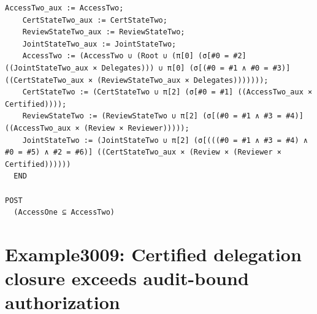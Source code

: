 \documentclass[10pt]{article}
\begin{document}
\begin{Verbatim}[fontsize=\tiny,breaklines=true,breakanywhere=true,frame=single,framesep=1.5mm]
    AccessTwo_aux := AccessTwo;
    CertStateTwo_aux := CertStateTwo;
    ReviewStateTwo_aux := ReviewStateTwo;
    JointStateTwo_aux := JointStateTwo;
    AccessTwo := (AccessTwo ∪ (Root ∪ (π[0] (σ[#0 = #2] ((JointStateTwo_aux × Delegates))) ∪ π[0] (σ[(#0 = #1 ∧ #0 = #3)] ((CertStateTwo_aux × (ReviewStateTwo_aux × Delegates)))))));
    CertStateTwo := (CertStateTwo ∪ π[2] (σ[#0 = #1] ((AccessTwo_aux × Certified))));
    ReviewStateTwo := (ReviewStateTwo ∪ π[2] (σ[(#0 = #1 ∧ #3 = #4)] ((AccessTwo_aux × (Review × Reviewer)))));
    JointStateTwo := (JointStateTwo ∪ π[2] (σ[(((#0 = #1 ∧ #3 = #4) ∧ #0 = #5) ∧ #2 = #6)] ((CertStateTwo_aux × (Review × (Reviewer × Certified))))))
  END

POST
  (AccessOne ⊆ AccessTwo)
\end{Verbatim}

\Needspace{0.45\textheight}

\section{Example3009: Certified delegation closure exceeds audit-bound authorization}\label{case:Example3009}
\end{document}
